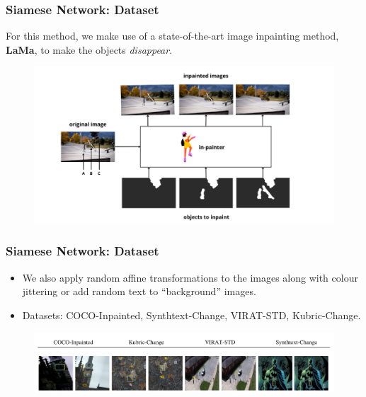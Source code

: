 \documentclass[13.5pt,aspecratio=169, xcolor=dvipsnames]{beamer}
\begin{document}
\begin{frame}
    \onehalfspacing
        \frametitle{Siamese Network: Dataset}
        For this method, we make use of a state-of-the-art image inpainting method, \textbf{LaMa}, to make the objects \textit{disappear}. 
        \begin{figure}[h]
            \centering
            \includegraphics[width=\linewidth]{Lama.png}
        \end{figure}
    \end{frame}
\begin{frame}
    \onehalfspacing
        \frametitle{Siamese Network: Dataset}
       
            \begin{itemize}
                \item We also apply random affine transformations to the images along with colour jittering or add random text to “background” images.
                \item Datasets: COCO-Inpainted, Synthtext-Change, VIRAT-STD, Kubric-Change.
                
            \end{itemize}

            \begin{figure}[h]
                \centering
                \includegraphics[width=\linewidth]{Siamese_dataset.png}
            \end{figure}

    \end{frame}
\end{document}
